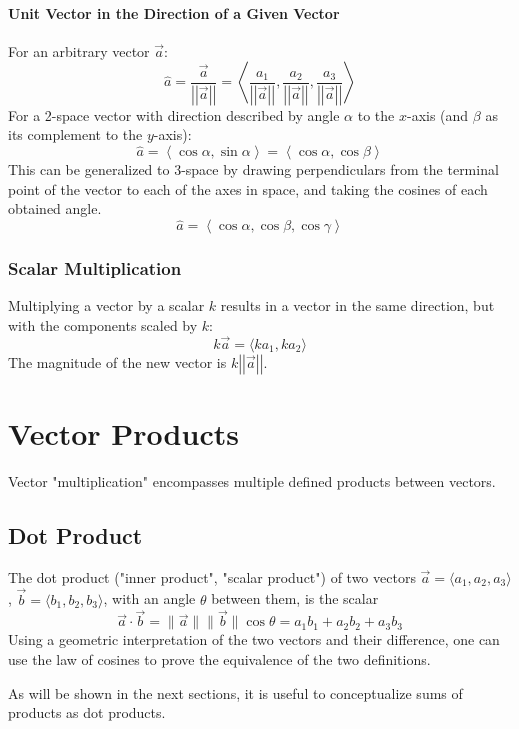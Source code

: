 \documentclass{article}
\newcommand{\vect}[1]{\ensuremath{\overrightarrow{#1}}}
\newcommand{\magnitude}[1]{\ensuremath{\lVert #1 \rVert}}
\newcommand{\magvect}[1]{\magnitude{\vect{#1}}}
\begin{document}
\paragraph{Unit Vector in the Direction of a Given Vector}
For an arbitrary vector $\overrightarrow{a}$:
$$\hat{a} = \frac{\overrightarrow{a}}{\left|\left|\overrightarrow{a}\right|\right|} = \left\langle \frac{a_1}{\left|\left|\overrightarrow{a}\right|\right|}, \frac{a_2}{\left|\left|\overrightarrow{a}\right|\right|}, \frac{a_3}{\left|\left|\overrightarrow{a}\right|\right|} \right\rangle$$
For a 2-space vector with direction described by angle $\alpha$ to the $x$-axis (and $\beta$ as its complement to the $y$-axis):
$$\hat{a} = \left\langle \cos{\alpha}, \sin{\alpha} \right\rangle = \left\langle \cos{\alpha}, \cos{\beta} \right\rangle$$
This can be generalized to 3-space by drawing perpendiculars from the terminal point of the vector to each of the axes in space, and taking the cosines of each obtained angle.
$$\hat{a} = \left\langle \cos{\alpha}, \cos{\beta}, \cos{\gamma} \right\rangle$$

\subsubsection{Scalar Multiplication}
Multiplying a vector by a scalar $k$ results in a vector in the same direction, but with the components scaled by $k$:
$$k\overrightarrow{a} = \langle ka_1, ka_2 \rangle$$
The magnitude of the new vector is $k\left|\left|\overrightarrow{a}\right|\right|$.

\section{Vector Products}
Vector "multiplication" encompasses multiple defined products between vectors.

\subsection{Dot Product}
The dot product ("inner product", "scalar product") of two vectors $\vect{a} = \langle a_1, a_2, a_3 \rangle$, $\vect{b} = \langle b_1, b_2, b_3 \rangle$, with an angle $\theta$ between them, is the scalar
$$\vect{a} \cdot \vect{b} = \magvect{a}\magvect{b}\cos{\theta} = a_1b_1 + a_2b_2 + a_3b_3$$
Using a geometric interpretation of the two vectors and their difference, one can use the law of cosines to prove the equivalence of the two definitions.

As will be shown in the next sections, it is useful to conceptualize sums of products as dot products.
\end{document}
